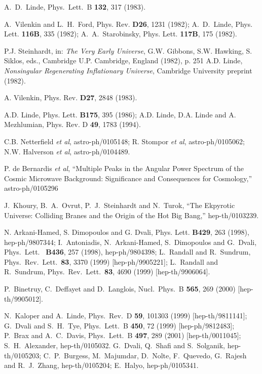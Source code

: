 \documentclass[a4paper,12pt]{article}
\begin{document}
\begin{thebibliography}{99}
A.~D.~Linde,
Phys.\ Lett.\ B {\bf 132}, 317 (1983).

 A.~Vilenkin and L.~H.~Ford, Phys. Rev. {\bf D26}, 1231
(1982);  A.~D.~Linde, Phys. Lett. {\bf 116B}, 335 (1982);
A.~A.~Starobinsky, Phys. Lett. {\bf 117B}, 175 (1982).



 

 P.J. Steinhardt, in:  {\it  The Very Early Universe}, G.W.
Gibbons, S.W. Hawking, S. Siklos, eds., Cambridge U.P. Cambridge, England
(1982), p. 251
 A.D. Linde,   {\it  Nonsingular Regenerating
Inflationary Universe}, Cambridge University preprint (1982).

 A. Vilenkin, Phys.    Rev.  {\bf D27},  2848 (1983).

 A.D. Linde,   Phys. Lett.  {\bf B175}, 395  (1986);
A.D. Linde, D.A. Linde  and
A. Mezhlumian,    Phys.   Rev. D {\bf 49},  1783  (1994).

 C.B. Netterfield {\it et al}, astro-ph/0105148;
R. Stompor {\it et al}, astro-ph/0105062; N.W. Halverson {\it et al}, astro-ph/0104489.

 P. de Bernardis {\it et al}, ``Multiple Peaks in the Angular Power Spectrum of the Cosmic Microwave Background: Significance and
     Consequences for Cosmology,'' astro-ph/0105296

 
J.~Khoury, B.~A.~Ovrut, P.~J.~Steinhardt and N.~Turok,  ``The Ekpyrotic Universe: Colliding Branes and the Origin of the Hot Big   
Bang,''  hep-th/0103239.   
   
   
   
 

 N. Arkani-Hamed, S. Dimopoulos and G. Dvali,    Phys.   
Lett. {\bf B429}, 263 (1998),   hep-ph/9807344;   I.~Antoniadis,   
N.~Arkani-Hamed, S.~Dimopoulos and G.~Dvali,  Phys.\ Lett.\  {\bf   
B436}, 257 (1998), hep-ph/9804398; L.~Randall and R.~Sundrum,   
Phys.\ Rev.\ Lett.\  {\bf 83}, 3370 (1999) [hep-ph/9905221]; L.~Randall   
and R.~Sundrum, Phys.\ Rev.\   
Lett.\  {\bf 83}, 4690 (1999) [hep-th/9906064].   
   
   
P.~Binetruy, C.~Deffayet and D.~Langlois,  Nucl.\ Phys.\ B {\bf 565}, 269 (2000)   
[hep-th/9905012].   
   
 N.~Kaloper and A.~Linde,
Phys.\ Rev.\ D {\bf 59}, 101303 (1999)
[hep-th/9811141]; G.~Dvali and S.~H.~Tye,  Phys.\ Lett.\ B {\bf 450}, 72 (1999)   
[hep-ph/9812483]; P.~Brax and A.~C.~Davis,
Phys.\ Lett.\ B {\bf 497}, 289 (2001)
[hep-th/0011045]; S.~H.~Alexander, hep-th/0105032. G.~Dvali, Q.~Shafi and S.~Solganik,  hep-th/0105203; C.~P.~Burgess, M.~Majumdar,   
D.~Nolte, F.~Quevedo, G.~Rajesh and R.~J.~Zhang, hep-th/0105204; E.~Halyo,
hep-ph/0105341.   
   

\end{thebibliography}
\end{document}
